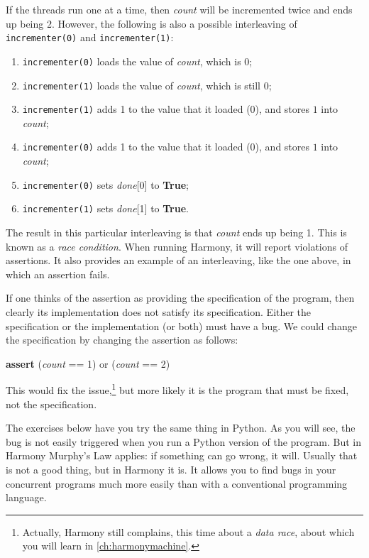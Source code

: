 \documentclass{report}
\newenvironment{code}{
\tcolorbox
}{
\endtcolorbox
}
\begin{document}
If the threads run one at a time, then \textit{count} will be incremented
twice and ends up being 2.  However, the following is also
a possible interleaving of \texttt{incrementer(0)} and \texttt{incrementer(1)}:
\begin{enumerate}
\item \texttt{incrementer(0)} loads the value of \textit{count}, which is 0;
\item \texttt{incrementer(1)} loads the value of \textit{count}, which is still 0;
\item \texttt{incrementer(1)} adds 1 to the value that it loaded (0), and
stores $1$ into \textit{count};
\item \texttt{incrementer(0)} adds 1 to the value that it loaded (0), and
stores $1$ into \textit{count};
\item \texttt{incrementer(0)} sets \textit{done}[0] to \textbf{True};
\item \texttt{incrementer(1)} sets \textit{done}[1] to \textbf{True}.
\end{enumerate}

The result in this particular interleaving is that \textit{count} ends up
being 1.
This is known as a \emph{race condition}.
%
When running Harmony, it will
report violations of assertions.  It also provides an example
of an interleaving, like the one above, in which an assertion fails.

%

If one thinks of the assertion as providing the specification of the
program, then clearly its implementation does not satisfy its specification.
Either the specification or the implementation (or both) must have a bug.
We could change the specification by changing the assertion as follows:

\begin{code}
\textbf{assert} (\textit{count} == 1) or (\textit{count} == 2)
\end{code}

This would fix the issue,\footnote{Actually, Harmony still complains, this time
about a \emph{data race}, about which you will learn in \autoref{ch:harmonymachine}.}
but more likely it is the program that must be fixed, not the specification.

The exercises below have you try the same thing in Python.  As you will
see, the bug is not easily triggered when you run a Python version of
the program.  But in Harmony Murphy's Law applies:
if something can go wrong, it will.  Usually that is not a good thing,
but in Harmony it is.  It allows you to find bugs in your concurrent
programs much more easily than with a conventional programming language.
\end{document}
